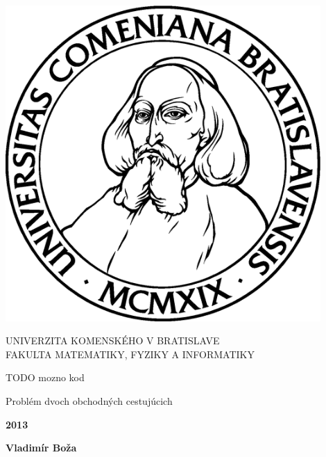 \documentclass[12pt,a4paper]{book}
\begin{document}
\thispagestyle{empty}
\begin{minipage}{0.25\textwidth}
\includegraphics[width=0.9\textwidth]{img/komlogo-new}
\end{minipage}
\begin{minipage}{0.69\textwidth}
\begin{center}
UNIVERZITA KOMENSKÉHO V BRATISLAVE \\
FAKULTA MATEMATIKY, FYZIKY A INFORMATIKY \\
\end{center}
\end{minipage}

\bigskip
TODO mozno kod

\vfill
\begin{center}
\begin{minipage}{0.8\textwidth}
\bigskip\medskip
\centerline{\LARGE\sc Problém dvoch obchodných cestujúcich}
\end{minipage}
\end{center}
\vfill
{\bf 2013}

\hfill{\bf Vladimír Boža}
\eject %
\end{document}
